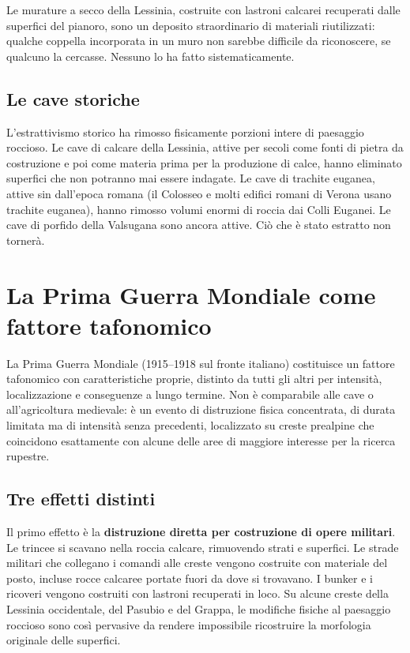 Le murature a secco della Lessinia, costruite con lastroni calcarei recuperati dalle superfici del pianoro, sono un deposito straordinario di materiali riutilizzati: qualche coppella incorporata in un muro non sarebbe difficile da riconoscere, se qualcuno la cercasse. Nessuno lo ha fatto sistematicamente.

\subsection{Le cave storiche}

L'estrattivismo storico ha rimosso fisicamente porzioni intere di paesaggio roccioso. Le cave di calcare della Lessinia, attive per secoli come fonti di pietra da costruzione e poi come materia prima per la produzione di calce, hanno eliminato superfici che non potranno mai essere indagate. Le cave di trachite euganea, attive sin dall'epoca romana (il Colosseo e molti edifici romani di Verona usano trachite euganea), hanno rimosso volumi enormi di roccia dai Colli Euganei. Le cave di porfido della Valsugana sono ancora attive. Ciò che è stato estratto non tornerà.

\section{La Prima Guerra Mondiale come fattore tafonomico}

La Prima Guerra Mondiale (1915--1918 sul fronte italiano) costituisce un fattore tafonomico con caratteristiche proprie, distinto da tutti gli altri per intensità, localizzazione e conseguenze a lungo termine. Non è comparabile alle cave o all'agricoltura medievale: è un evento di distruzione fisica concentrata, di durata limitata ma di intensità senza precedenti, localizzato su creste prealpine che coincidono esattamente con alcune delle aree di maggiore interesse per la ricerca rupestre.

\subsection{Tre effetti distinti}

Il primo effetto è la \textbf{distruzione diretta per costruzione di opere militari}. Le trincee si scavano nella roccia calcare, rimuovendo strati e superfici. Le strade militari che collegano i comandi alle creste vengono costruite con materiale del posto, incluse rocce calcaree portate fuori da dove si trovavano. I bunker e i ricoveri vengono costruiti con lastroni recuperati in loco. Su alcune creste della Lessinia occidentale, del Pasubio e del Grappa, le modifiche fisiche al paesaggio roccioso sono così pervasive da rendere impossibile ricostruire la morfologia originale delle superfici.

